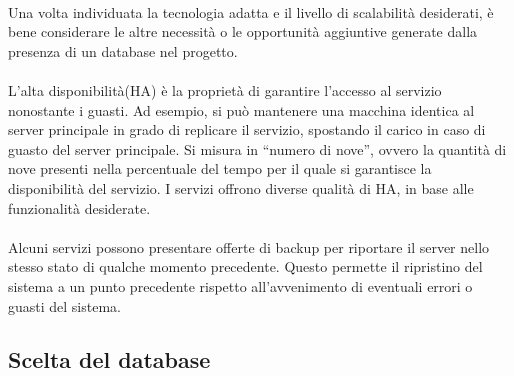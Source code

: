 \\
Una volta individuata la tecnologia adatta e il livello di scalabilità desiderati,
è bene considerare le altre necessità o le opportunità aggiuntive generate
dalla presenza di un database nel progetto. \\
\\
L'alta disponibilità(HA) è la proprietà di garantire l'accesso al servizio nonostante i guasti.
Ad esempio, si può mantenere una macchina identica al server principale in grado di replicare il servizio,
spostando il carico in caso di guasto del server principale.
Si misura in “numero di nove”, ovvero la quantità di nove presenti
nella percentuale del tempo per il quale si garantisce la disponibilità del servizio.
I servizi offrono diverse qualità di HA, in base alle funzionalità desiderate.\\
\\
Alcuni servizi possono presentare offerte di backup
per riportare il server nello stesso stato di qualche momento precedente.
Questo permette il ripristino del sistema a un punto precedente
rispetto all'avvenimento di eventuali errori o guasti del sistema.\\
\subsection{Scelta del database}

